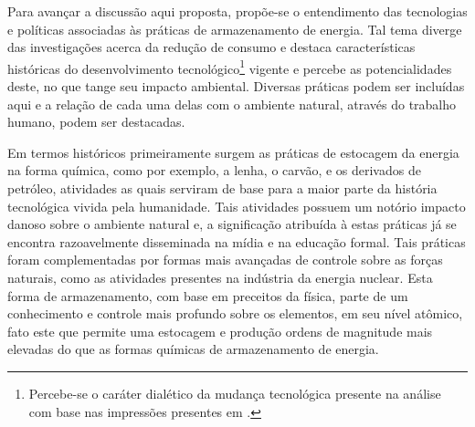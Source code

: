 \documentclass[
   article,       %
   12pt,          %
   oneside,       %
   a4paper,       %
   english,       %
   brazil,           %
   sumario=tradicional
   ]{abntex2}
\begin{document}
Para avançar a discussão aqui proposta, propõe-se o entendimento das tecnologias e políticas associadas às práticas de armazenamento de energia. Tal tema diverge das investigações acerca da redução de consumo e destaca características históricas do desenvolvimento tecnológico\footnote{Percebe-se o caráter dialético da mudança tecnológica presente na análise com base nas impressões presentes em \cite{DIALECTICAL_TECHNOLOGY}.} vigente e percebe as potencialidades deste, no que tange seu impacto ambiental. Diversas práticas podem ser incluídas aqui e a relação de cada uma delas com o ambiente natural, através do trabalho humano, podem ser destacadas.

Em termos históricos primeiramente surgem as práticas de estocagem da energia na forma química, como por exemplo, a lenha, o carvão, e os derivados de petróleo, atividades as quais serviram de base para a maior parte da história tecnológica vivida pela humanidade. Tais atividades possuem um notório impacto danoso sobre o ambiente natural e, a significação atribuída à estas práticas já se encontra razoavelmente disseminada na mídia e na educação formal. Tais práticas foram complementadas por formas mais avançadas de controle sobre as forças naturais, como as atividades presentes na indústria da energia nuclear. Esta forma de armazenamento, com base em preceitos da física, parte de um conhecimento e controle mais profundo sobre os elementos, em seu nível atômico, fato este que permite uma estocagem e produção ordens de magnitude mais elevadas do que as formas químicas de armazenamento de energia.
\end{document}
